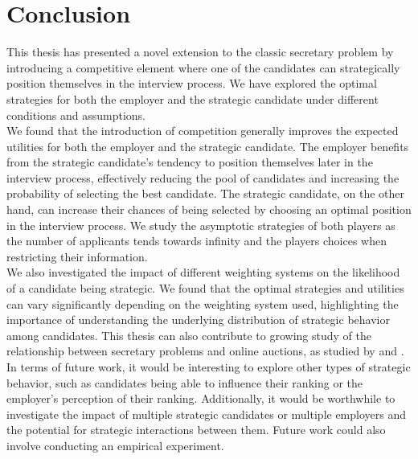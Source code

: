 \documentclass{article}
\begin{document}
\section{Conclusion}

This thesis has presented a novel extension to the classic secretary problem by introducing a competitive element where one of the candidates can strategically position themselves in the interview process. We have explored the optimal strategies for both the employer and the strategic candidate under different conditions and assumptions.
\\[2ex]
We found that the introduction of competition generally improves the expected utilities for both the employer and the strategic candidate. The employer benefits from the strategic candidate's tendency to position themselves later in the interview process, effectively reducing the pool of candidates and increasing the probability of selecting the best candidate. The strategic candidate, on the other hand, can increase their chances of being selected by choosing an optimal position in the interview process. We study the asymptotic strategies of both players as the number of applicants tends towards infinity and the players choices when restricting their information.
\\[2ex]
We also investigated the impact of different weighting systems on the likelihood of a candidate being strategic. We found that the optimal strategies and utilities can vary significantly depending on the weighting system used, highlighting the importance of understanding the underlying distribution of strategic behavior among candidates. This thesis can also contribute to growing study of the relationship between secretary problems and online auctions, as studied by \cite{hajiaghayi2004adaptive} and \cite{babaioff2008online}.
\\[2ex]
In terms of future work, it would be interesting to explore other types of strategic behavior, such as candidates being able to influence their ranking or the employer's perception of their ranking. Additionally, it would be worthwhile to investigate the impact of multiple strategic candidates or multiple employers and the potential for strategic interactions between them. Future work could also involve conducting an empirical experiment. 

\newpage



\newpage
\end{document}
